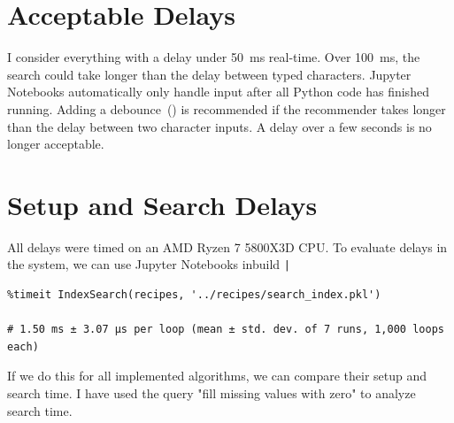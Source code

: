 \documentclass[
     12pt,                    %
     a4paper,             %
     BCOR=10mm,     %
     DIV=14,                 %
     listof=totoc,                    %
     bibliography=totoc,       %
     index=totoc,              %
     twoside,
     headsepline
     ]{scrreprt}
\begin{document}
\section{Acceptable Delays}

I consider everything with a delay under \SI{50}{\milli\second} real-time. Over \SI{100}{\milli\second}, the search could take longer than the delay between typed characters. Jupyter Notebooks automatically only handle input after all Python code has finished running. Adding a debounce~() is recommended if the recommender takes longer than the delay between two character inputs. A delay over a few seconds is no longer acceptable.

\section{Setup and Search Delays}

All delays were timed on an AMD Ryzen 7 5800X3D CPU. To evaluate delays in the system, we can use Jupyter Notebooks inbuild \texttt|%

\begin{listing}[htb]
	\begin{verbatim}
%timeit IndexSearch(recipes, '../recipes/search_index.pkl')

# 1.50 ms ± 3.07 µs per loop (mean ± std. dev. of 7 runs, 1,000 loops each)
	\end{verbatim}
	\caption[Timing index search with a saved index]{Timing index search with a saved index.\label{list:searchsetup}}
\end{listing}

If we do this for all implemented algorithms, we can compare their setup and search time. I have used the query "fill missing values with zero" to analyze search time.
\end{document}
